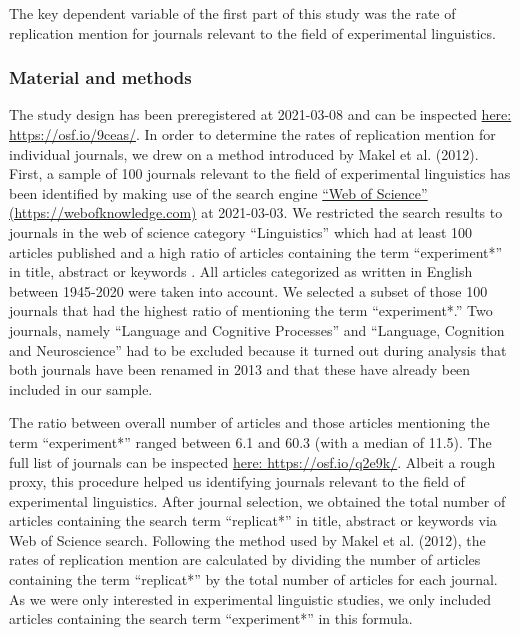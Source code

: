 \documentclass[]{elsarticle} %
\begin{document}
The key dependent variable of the first part of this study was the rate
of replication mention for journals relevant to the field of
experimental linguistics.

\hypertarget{material-and-methods}{%
\subsubsection{Material and methods}\label{material-and-methods}}

The study design has been preregistered at 2021-03-08 and can be
inspected \href{https://osf.io/9ceas/}{here: https://osf.io/9ceas/}. In
order to determine the rates of replication mention for individual
journals, we drew on a method introduced by Makel et al. (2012). First,
a sample of 100 journals relevant to the field of experimental
linguistics has been identified by making use of the search engine
\href{https://webofknowledge.com}{``Web of Science''
(https://webofknowledge.com)} at 2021-03-03. We restricted the search
results to journals in the web of science category ``Linguistics'' which
had at least 100 articles published and a high ratio of articles
containing the term ``experiment*'' in title, abstract or keywords . All
articles categorized as written in English between 1945-2020 were taken
into account. We selected a subset of those 100 journals that had the
highest ratio of mentioning the term ``experiment*.'' Two journals,
namely ``Language and Cognitive Processes'' and ``Language, Cognition
and Neuroscience'' had to be excluded because it turned out during
analysis that both journals have been renamed in 2013 and that these
have already been included in our sample.

The ratio between overall number of articles and those articles
mentioning the term ``experiment*'' ranged between 6.1 and 60.3 (with a
median of 11.5). The full list of journals can be inspected
\href{https://osf.io/q2e9k/}{here: https://osf.io/q2e9k/}. Albeit a
rough proxy, this procedure helped us identifying journals relevant to
the field of experimental linguistics. After journal selection, we
obtained the total number of articles containing the search term
``replicat*'' in title, abstract or keywords via Web of Science search.
Following the method used by Makel et al. (2012), the rates of
replication mention are calculated by dividing the number of articles
containing the term ``replicat*'' by the total number of articles for
each journal. As we were only interested in experimental linguistic
studies, we only included articles containing the search term
``experiment*'' in this formula.
\end{document}
